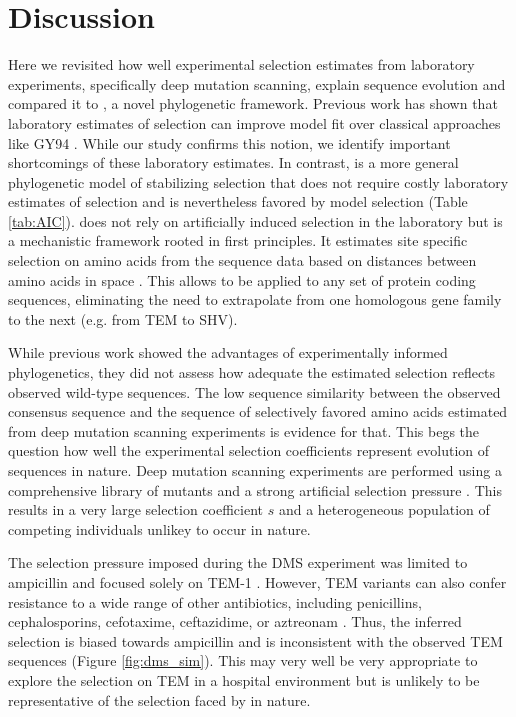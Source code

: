 \section{Discussion}

Here we revisited how well experimental selection estimates from laboratory experiments, specifically deep mutation scanning, explain sequence evolution and compared it to \selac, a novel phylogenetic framework.
Previous work has shown that laboratory estimates of selection can improve model fit over classical approaches like GY94 \citep{bloom2014, bloom2017}.
While our study confirms this notion, we identify important shortcomings of these laboratory estimates.
In contrast, \selac is a more general phylogenetic model of stabilizing selection that does not require costly laboratory estimates of selection and is nevertheless favored by model selection (Table \ref{tab:AIC}).
\selac does not rely on artificially induced selection in the laboratory but is a mechanistic framework rooted in first principles.
It estimates site specific selection on amino acids from the sequence data based on distances between amino acids in \PC space \citep{grantham1974,beaulieu2018}.
This allows \selac to be applied to any set of protein coding sequences, eliminating the need to extrapolate from one homologous gene family to the next (e.g. from TEM to SHV).

While previous work showed the advantages of experimentally informed phylogenetics, they did not assess how adequate the estimated selection reflects observed wild-type sequences.
The low sequence similarity between the observed consensus sequence and the sequence of selectively favored amino acids estimated from deep mutation scanning experiments is evidence for that.
This begs the question how well the experimental selection coefficients represent evolution of sequences in nature.
Deep mutation scanning experiments are performed using a comprehensive library of mutants and a strong artificial selection pressure \citep{FirnbergAndOstermeier2012, Jain2014, FowlerAndFields2014, Fowler2014}.
This results in a very large selection coefficient $s$ and a heterogeneous population of competing individuals unlikey to occur in nature.

The selection pressure imposed during the DMS experiment was limited to ampicillin and focused solely on TEM-1 \citep{stiffler2016}.
However, TEM variants can also confer resistance to a wide range of other antibiotics, including penicillins, cephalosporins, cefotaxime, ceftazidime, or aztreonam \citep{sougakoff1988,sougakoff1989,goussard1991,mabilat1992,chanal1992,brun1994}.
Thus, the inferred selection is biased towards ampicillin and is inconsistent with the observed TEM sequences (Figure \ref{fig:dms_sim}).
This may very well be very appropriate to explore the selection on TEM in a hospital environment but is unlikely to be representative of the selection faced by \ecoli in nature.

